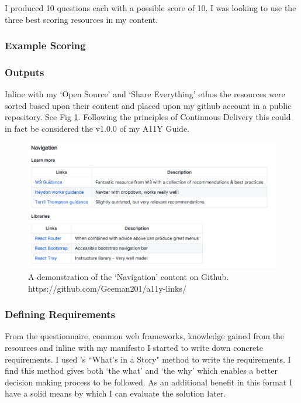 I produced 10 questions each with a possible score of 10. I was looking to
use the three best scoring resources in my content.

\subsubsection{Example Scoring}


\subsubsection{Outputs}
Inline with my `Open Source' and `Share Everything' ethos the resources were
sorted based upon their content and placed upon my github account in a public
 repository.
See Fig \ref{fig:allyLinksDemo}.
Following the principles of Continuous Delivery this could in fact be
considered the v1.0.0 of my A11Y Guide.

\begin{figure}[H]
\centering
\includegraphics[width=\textwidth]{figures/documentation_link_example}
\captionsetup{justification=centering}
\caption{A demonstration of the `Navigation' content on Github.
https://github.com/Geeman201/a11y-links/
\label{fig:allyLinksDemo}}
\end{figure}


\subsubsection{Defining Requirements}
\label{sec:requirements}
From the questionnaire, common web frameworks, knowledge gained from the
resources and inline with my manifesto I started to write down concrete
requirements. I used \cite*{DanNorth}'s ``What's in a Story" method to write the
requirements. I find this method gives both `the what' and `the why' which
enables a better decision making process to be followed. As an additional
benefit in this format I have a solid means by which I can evaluate the
solution later.

